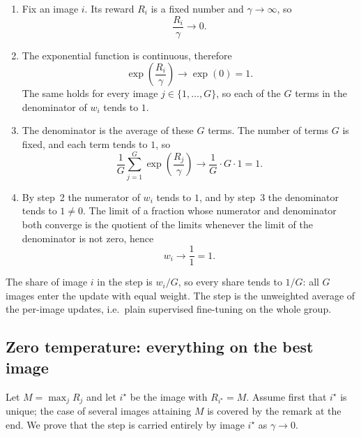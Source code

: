 \documentclass[10pt]{article} %
\begin{document}
\begin{enumerate}
\item Fix an image $i$. Its reward $R_i$ is a fixed number and $\gamma\to\infty$, so
\[
\frac{R_i}{\gamma}\to 0 .
\]
\item The exponential function is continuous, therefore
\[
\exp\left(\frac{R_i}{\gamma}\right)\to\exp(0)=1 .
\]
The same holds for every image $j\in\{1,\dots,G\}$, so each of the $G$ terms in the denominator of $w_i$ tends to $1$.
\item The denominator is the average of these $G$ terms. The number of terms $G$ is fixed, and each term tends to $1$, so
\[
\frac{1}{G}\sum_{j=1}^{G}\exp\left(\frac{R_j}{\gamma}\right)\to\frac{1}{G}\cdot G\cdot 1=1 .
\]
\item By step~2 the numerator of $w_i$ tends to $1$, and by step~3 the denominator tends to $1\neq 0$. The limit of a fraction whose numerator and denominator both converge is the quotient of the limits whenever the limit of the denominator is not zero, hence
\[
w_i\to\frac{1}{1}=1 .
\]
\end{enumerate}

The share of image $i$ in the step is $w_i/G$, so every share tends to $1/G$: all $G$ images enter the update with equal weight. The step is the unweighted average of the per-image updates, i.e.\ plain supervised fine-tuning on the whole group.

\subsection{Zero temperature: everything on the best image}

Let $M=\max_j R_j$ and let $i^\star$ be the image with $R_{i^\star}=M$. Assume first that $i^\star$ is unique; the case of several images attaining $M$ is covered by the remark at the end. We prove that the step is carried entirely by image $i^\star$ as $\gamma\to 0$.
\end{document}
